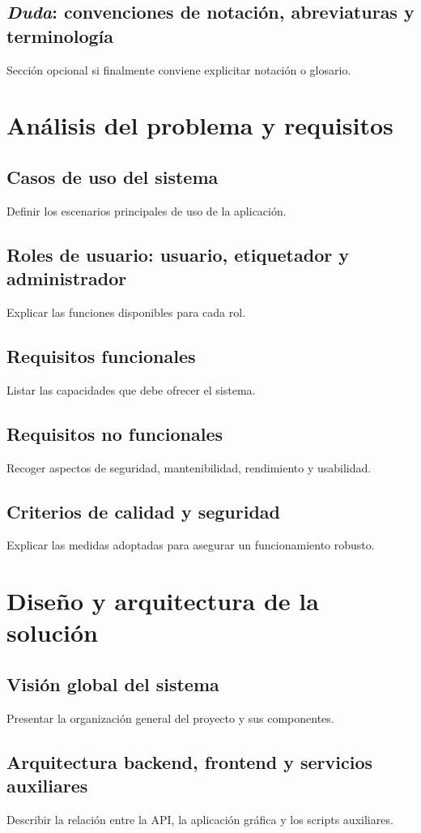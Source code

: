 \documentclass[11pt,spanish,listoffigures,listoftables]{tfgetsinf}
\begin{document}
\section{\textit{Duda}: convenciones de notación, abreviaturas y terminología}
Sección opcional si finalmente conviene explicitar notación o glosario.

\chapter{Análisis del problema y requisitos}
\section{Casos de uso del sistema}
Definir los escenarios principales de uso de la aplicación.

\section{Roles de usuario: usuario, etiquetador y administrador}
Explicar las funciones disponibles para cada rol.

\section{Requisitos funcionales}
Listar las capacidades que debe ofrecer el sistema.

\section{Requisitos no funcionales}
Recoger aspectos de seguridad, mantenibilidad, rendimiento y usabilidad.

\section{Criterios de calidad y seguridad}
Explicar las medidas adoptadas para asegurar un funcionamiento robusto.

\chapter{Diseño y arquitectura de la solución}
\section{Visión global del sistema}
Presentar la organización general del proyecto y sus componentes.

\section{Arquitectura backend, frontend y servicios auxiliares}
Describir la relación entre la API, la aplicación gráfica y los scripts auxiliares.
\end{document}
